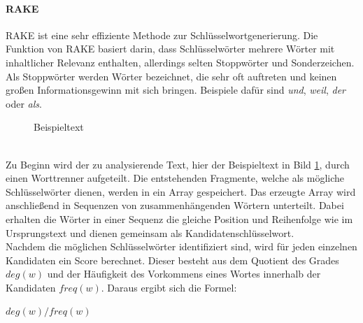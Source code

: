 		\paragraph{RAKE}
		RAKE ist eine sehr effiziente Methode zur Schlüsselwortgenerierung. Die Funktion von RAKE basiert darin, dass Schlüsselwörter mehrere Wörter mit inhaltlicher Relevanz enthalten, allerdings selten Stoppwörter und Sonderzeichen.\cite{rose2010automatic}\\
		Als Stoppwörter werden Wörter bezeichnet, die sehr oft auftreten und keinen großen Informationsgewinn mit sich bringen. Beispiele dafür sind \textit{und}, \textit{weil}, \textit{der} oder \textit{als}.\cite{Stopwords}
			\begin{figure}[h!]
				\caption{Beispieltext \cite{schubert2011didaktik}}
				\label{fig:text}
			\end{figure}\\
			Zu Beginn wird der zu analysierende Text, hier der Beispieltext in Bild \ref{fig:text}, durch einen Worttrenner aufgeteilt. Die entstehenden Fragmente, welche als mögliche Schlüsselwörter dienen, werden in ein Array gespeichert. Das erzeugte Array wird anschließend in Sequenzen von zusammenhängenden Wörtern unterteilt. Dabei erhalten die Wörter in einer Sequenz die gleiche Position und Reihenfolge wie im Ursprungstext und dienen gemeinsam als Kandidatenschlüsselwort.\cite{rose2010automatic}\\	
			Nachdem die möglichen Schlüsselwörter identifiziert sind, wird für jeden einzelnen Kandidaten ein Score berechnet. Dieser besteht aus dem Quotient des Grades $deg(w)$ und der Häufigkeit des Vorkommens eines Wortes innerhalb der Kandidaten $freq(w)$. Daraus ergibt sich die Formel:
			\begin{center}
				$deg(w)/freq(w) $
			\end{center}	
			
